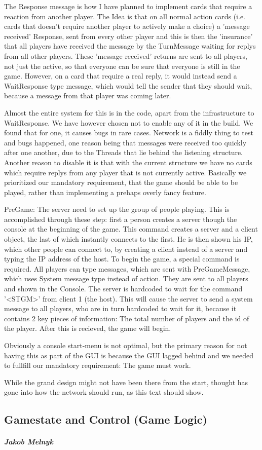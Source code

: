 The Response message is how I have planned to implement cards that require a reaction from another player.
The Idea is that on all normal action cards (i.e. cards that doesn't require another player to actively make a choice) a 'message received' Response, sent from every other player and this is then the 'insurance' that all players have received the message by the TurnMessage waiting for replys from all other players. 
These 'message received' returns are sent to all players, not just the active, so that everyone can be sure that everyone is still in the game.
However, on a card that require a real reply, it would instead send a WaitResponse type message, which would tell the sender that they should wait, because a message from that player was coming later.

Almost the entire system for this is in the code, apart from the infrastructure to WaitResponse. 
We have however chosen not to enable any of it in the build. We found that for one, it causes bugs in rare cases.
Network is a fiddly thing to test and bugs happened, one reason being that messages were received too quickly after one another, due to the Threads that lie behind the listening structure. Another reason to disable it is that with the current structure we have no cards which require replys from any player that is not currently active.
Basically we prioritized our mandatory requirement, that the game should be able to be played, rather than implementing a prehaps overly fancy feature.

PreGame:
The server need to set up the group of people playing. 
This is accomplished through these step: first a person creates a server though the console at the beginning of the game. 
This command creates a server and a client object, the last of which instantly connects to the first. 
He is then shown his IP, which other people can connect to, by creating a client instead of a server and typing the IP address of the host.
To begin the game, a special command is required. All players can type messages, which are sent with PreGameMessage, which uses System message type instead of action. 
They are sent to all players and shown in the Console. The server is hardcoded to wait for the command '<STGM>' from client 1 (the host). 
This will cause the server to send a system message to all players, who are in turn hardcoded to wait for it, because it contains 2 key pieces of information: The total number of players and the id of the player. 
After this is recieved, the game will begin.

Obviously a console start-menu is not optimal, but the primary reason for not having this as part of the GUI is because the GUI lagged behind and we needed to fullfill our mandatory requirement: The game must work.

While the grand design might not have been there from the start, thought has gone into how the network should run, as this text should show.

\subsection{Gamestate and Control (Game Logic)}
\subparagraph{Jakob Melnyk}
